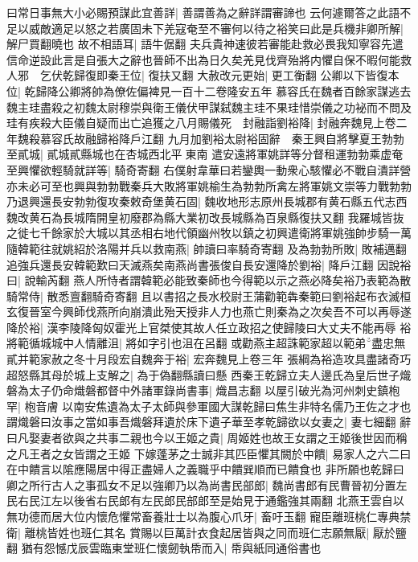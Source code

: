 曰常日事無大小必賜預謀此宜善詳|{
	善謂善為之辭詳謂審諦也}
云何遽爾答之此語不足以威敵適足以怒之若廣固未下羌寇奄至不審何以待之裕笑曰此是兵機非卿所解|{
	解尸買翻曉也}
故不相語耳|{
	語牛倨翻}
夫兵貴神速彼若審能赴救必畏我知寧容先遣信命逆設此言是自張大之辭也晉師不出為日久矣羌見伐齊殆將内懼自保不暇何能救人邪　乞伏乾歸復即秦王位|{
	復扶又翻}
大赦改元更始|{
	更工衡翻}
公卿以下皆復本位|{
	乾歸降公卿將帥為僚佐偏裨見一百十二卷隆安五年}
慕容氏在魏者百餘家謀逃去魏主珪盡殺之初魏太尉穆崇與衛王儀伏甲謀弑魏主珪不果珪惜崇儀之功袐而不問及珪有疾殺大臣儀自疑而出亡追獲之八月賜儀死　封融詣劉裕降|{
	封融奔魏見上卷二年魏殺慕容氏故融歸裕降戶江翻}
九月加劉裕太尉裕固辭　秦王興自將擊夏王勃勃至貳城|{
	貳城貳縣城也在杏城西北平東南}
遣安遠將軍姚詳等分督租運勃勃乘虚奄至興懼欲輕騎就詳等|{
	騎奇寄翻}
右僕射韋華曰若鑾輿一動衆心駭懼必不戰自潰詳營亦未必可至也興與勃勃戰秦兵大敗將軍姚榆生為勃勃所禽左將軍姚文崇等力戰勃勃乃退興還長安勃勃復攻秦敕奇堡黄石固|{
	魏收地形志原州長城郡有黄石縣五代志西魏改黄石為長城隋開皇初廢郡為縣大業初改長城縣為百泉縣復扶又翻}
我羅城皆抜之徙七千餘家於大城以其丞相右地代領幽州牧以鎮之初興遣衛將軍姚強帥步騎一萬隨韓範往就姚紹於洛陽并兵以救南燕|{
	帥讀曰率騎奇寄翻}
及為勃勃所敗|{
	敗補邁翻}
追強兵還長安韓範歎曰天滅燕矣南燕尚書張俊自長安還降於劉裕|{
	降戶江翻}
因說裕曰|{
	說輸芮翻}
燕人所恃者謂韓範必能致秦師也今得範以示之燕必降矣裕乃表範為散騎常侍|{
	散悉亶翻騎奇寄翻}
且以書招之長水校尉王蒲勸範犇秦範曰劉裕起布衣滅桓玄復晉室今興師伐燕所向崩潰此殆天授非人力也燕亡則秦為之次矣吾不可以再辱遂降於裕|{
	漢李陵降匈奴霍光上官桀使其故人任立政招之使歸陵曰大丈夫不能再辱}
裕將範循城城中人情離沮|{
	將如字引也沮在呂翻}
或勸燕主超誅範家超以範弟盡忠無貳并範家赦之冬十月段宏自魏奔于裕|{
	宏奔魏見上卷三年}
張綱為裕造攻具盡諸奇巧超怒縣其母於城上支解之|{
	為于偽翻縣讀曰懸}
西秦王乾歸立夫人邊氏為皇后世子熾磐為太子仍命熾磐都督中外諸軍錄尚書事|{
	熾昌志翻}
以屋引破光為河州刺史鎮枹罕|{
	枹音膚}
以南安焦遺為太子太師與參軍國大謀乾歸曰焦生非特名儒乃王佐之才也謂熾磐曰汝事之當如事吾熾磐拜遺於床下遺子華至孝乾歸欲以女妻之|{
	妻七細翻}
辭曰凡娶妻者欲與之共事二親也今以王姬之貴|{
	周姬姓也故王女謂之王姬後世因而稱之凡王者之女皆謂之王姬}
下嫁蓬茅之士誠非其匹臣懼其闕於中饋|{
	易家人之六二曰在中饋言以隂應陽居中得正盡婦人之義職乎中饋巽順而已饋食也}
非所願也乾歸曰卿之所行古人之事孤女不足以強卿乃以為尚書民部郎|{
	魏尚書郎有民曹晉初分置左民右民江左以後省右民郎有左民郎民部郎至是始見于通鑑強其兩翻}
北燕王雲自以無功德而居大位内懷危懼常畜養壯士以為腹心爪牙|{
	畜吁玉翻}
寵臣離班桃仁專典禁衛|{
	離桃皆姓也班仁其名}
賞賜以巨萬計衣食起居皆與之同而班仁志願無厭|{
	厭於鹽翻}
猶有怨憾戊辰雲臨東堂班仁懷劒執帋而入|{
	帋與紙同通俗書也}
